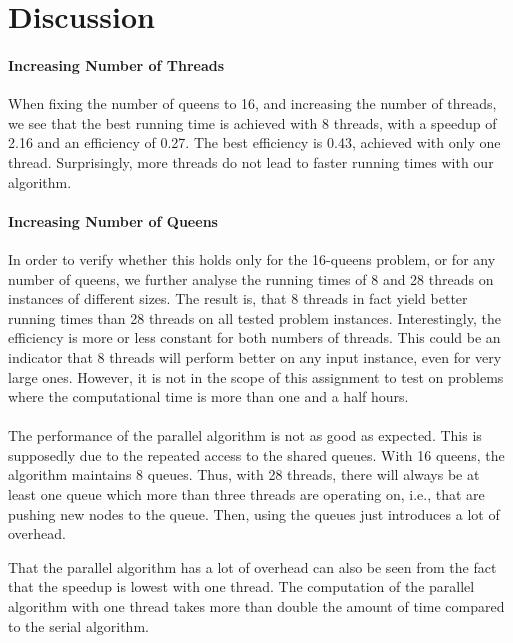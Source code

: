 \section{Discussion}

\paragraph{Increasing Number of Threads}
When fixing the number of queens to 16, and increasing the number of threads, we see that the best running time is achieved with 8 threads, with a speedup of 2.16 and an efficiency of 0.27.
The best efficiency is 0.43, achieved with only one thread.
Surprisingly, more threads do not lead to faster running times with our algorithm.

\paragraph{Increasing Number of Queens}
In order to verify whether this holds only for the 16-queens problem, or for any number of queens, we further analyse the running times of 8 and 28 threads on instances of different sizes.
The result is, that 8 threads in fact yield better running times than 28 threads on all tested problem instances.
Interestingly, the efficiency is more or less constant for both numbers of threads.
This could be an indicator that 8 threads will perform better on any input instance, even for very large ones.
However, it is not in the scope of this assignment to test on problems where the computational time is more than one and a half hours.

\paragraph{}
The performance of the parallel algorithm is not as good as expected.
This is supposedly due to the repeated access to the shared queues.
With 16 queens, the algorithm maintains 8 queues.
Thus, with 28 threads, there will always be at least one queue which more than three threads are operating on, i.e., that are pushing new nodes to the queue.
Then, using the queues just introduces a lot of overhead.

That the parallel algorithm has a lot of overhead can also be seen from the fact that the speedup is lowest with one thread.
The computation of the parallel algorithm with one thread takes more than double the amount of time compared to the serial algorithm.


